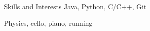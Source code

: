 
\begin{rubric}{Skills and Interests}
	Java, Python, C/C++, Git

\entry*[Misc.]
	Physics, cello, piano, running
\end{rubric}
